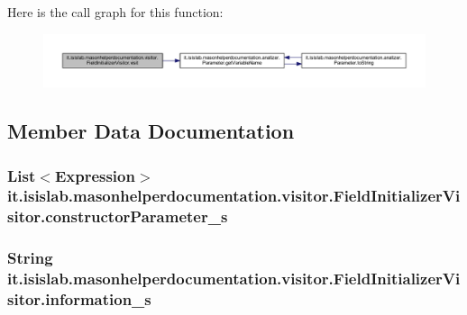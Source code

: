 Here is the call graph for this function\-:
\nopagebreak
\begin{figure}[H]
\begin{center}
\leavevmode
\includegraphics[width=350pt]{classit_1_1isislab_1_1masonhelperdocumentation_1_1visitor_1_1_field_initializer_visitor_aa102c9e14ce33b802171e97ff59c6522_cgraph}
\end{center}
\end{figure}




\subsection{Member Data Documentation}
\hypertarget{classit_1_1isislab_1_1masonhelperdocumentation_1_1visitor_1_1_field_initializer_visitor_ababaa84c922c5ce27fc9880abe7ae4dd}{
\subsubsection[{constructor\-Parameter\-\_\-s}]{\setlength{\rightskip}{0pt plus 5cm}List$<$Expression$>$ it.\-isislab.\-masonhelperdocumentation.\-visitor.\-Field\-Initializer\-Visitor.\-constructor\-Parameter\-\_\-s\hspace{0.3cm}{\ttfamily [private]}}}\label{classit_1_1isislab_1_1masonhelperdocumentation_1_1visitor_1_1_field_initializer_visitor_ababaa84c922c5ce27fc9880abe7ae4dd}
\hypertarget{classit_1_1isislab_1_1masonhelperdocumentation_1_1visitor_1_1_field_initializer_visitor_af2beae06e1c3a7541b19ceeb6be6c7b8}{
\subsubsection[{information\-\_\-s}]{\setlength{\rightskip}{0pt plus 5cm}String it.\-isislab.\-masonhelperdocumentation.\-visitor.\-Field\-Initializer\-Visitor.\-information\-\_\-s\hspace{0.3cm}{\ttfamily [private]}}}\label{classit_1_1isislab_1_1masonhelperdocumentation_1_1visitor_1_1_field_initializer_visitor_af2beae06e1c3a7541b19ceeb6be6c7b8}
